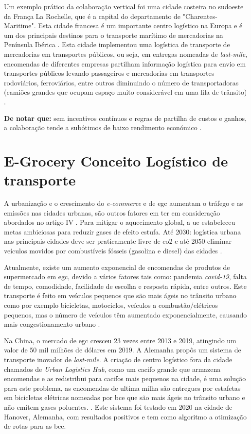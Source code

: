 Um exemplo prático da colaboração vertical foi uma cidade costeira no sudoeste da França La Rochelle, que é a capital do departamento de "Charentes-Maritime".
Esta cidade francesa é um importante centro logístico na Europa e é um dos principais destinos para o transporte marítimo de mercadorias na Península Ibérica \cite{FreighttransporttoLaRochelle}.
Esta cidade implementou uma logística de transporte de mercadorias em transportes públicos, ou seja, em entregas nomeadas de \textit{last-mile}, encomendas de diferentes empresas partilham informação logística para envio em transportes públicos levando passageiros e mercadorias em transportes rodoviários, ferroviários, entre outros diminuindo o número de transportadoras (camiões grandes que ocupam espaço muito considerável em uma fila de trânsito) \cite{CLEOPHAS2019801}.

\textbf{De notar que:} sem incentivos contínuos e regras de partilha de custos e ganhos, a colaboração tende a subótimos de baixo rendimento económico \cite{CLEOPHAS2019801}.
\section{E-Grocery Conceito Logístico de transporte}
\label{sec:egcconceitologisticotransporte}


A urbanização e o crescimento do \textit{e-commerce} e de \gls{egc} aumentam o tráfego e as emissões nas cidades urbanas, são outros fatores em ter em consideração abordados no artigo IV \cite{article2}.
Para mitigar o aquecimento global, a \gls{ue} estabeleceu metas ambiciosas para reduzir gases de efeito estufa.
Até 2030: logística urbana nas principais cidades deve ser praticamente livre de \gls{co2} e até 2050 eliminar veículos movidos por combustíveis fósseis (gasolina e diesel) das cidades \cite{article2}.

Atualmente, existe um aumento exponencial de encomendas de produtos de supermercado em \gls{egc}, devido a vários fatores tais como: pandemia \textit{covid-19}, falta de tempo, comodidade, facilidade de escolha e resposta rápida, entre outros.
Este transporte é feito em veículos pequenos que são mais ágeis no trânsito urbano como por exemplo bicicletas, motociclos, veículos a combustão/elétricos pequenos, mas o número de veículos têm aumentado exponencialmente, causando mais congestionamento urbano \cite{article2}.

Na China, o mercado de \gls{egc} cresceu 23 vezes entre 2013 e 2019, atingindo um valor de 50 mil milhões de dólares em 2019\cite{article2}.
A Alemanha propôs um sistema de transporte inovador de \textit{last-mile}.
A criação de centro logístico fora da cidade chamados de \textit{Urban Logistics Hub}, como um cacifo grande que armazena encomendas e as redistribui para cacifos mais pequenos na cidade, é uma solução para este problema, as encomendas de ultima milha são entregues por estafetas em bicicletas elétricas nomeadas por \gls{bce}  que são mais ágeis no trânsito urbano e não emitem gases poluentes. \cite{article2}.
Este sistema foi testado em 2020 na cidade de Hanover, Alemanha, com resultados positivos e tem como algoritmo a otimização de rotas para as \gls{bce}.

